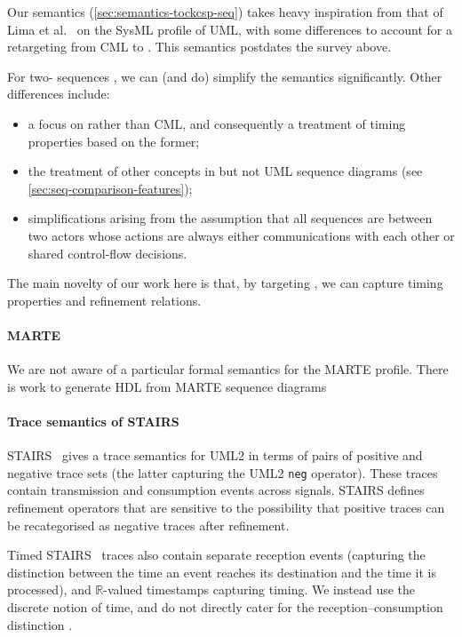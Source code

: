 Our semantics (\cref{sec:semantics-tockcsp-seq}) takes heavy inspiration from
that of Lima et al.~\cite{lima-semantics} on the SysML profile of UML, with
some differences to account for a retargeting from CML to \tockcsp.  This
semantics postdates the survey above.

For two-\mactor{} sequences , we can (and do)
simplify the semantics significantly.  Other differences include:

\begin{itemize}
\item a focus on \tockcsp{} rather than CML, and consequently a
  treatment of timing properties based on the former;
\item
  the treatment of other concepts in \langname{} but not UML sequence
  diagrams (see \cref{sec:seq-comparison-features});
\item simplifications arising from the assumption that all sequences
  are between two actors whose actions are always either communications with
  each other or shared control-flow decisions.
\end{itemize}

The main novelty of our work here is that, by targeting \tockcsp, we can capture
timing properties and refinement relations.

\paragraph{MARTE}

We are not aware of a particular formal semantics for the MARTE profile.
There is work to generate HDL from MARTE sequence diagrams~

\paragraph{Trace semantics of STAIRS}

STAIRS~\cite{Haugen03-STAIRS} gives a trace semantics for UML2 in terms
of pairs of positive and negative trace sets (the latter capturing the UML2
\texttt{neg} operator).  These traces contain
transmission and consumption events across signals.  STAIRS defines
refinement operators that are sensitive to the possibility that positive
traces can be recategorised as negative traces after refinement.

Timed
STAIRS~\cite{Haugen05-TimedSTAIRS} traces also contain separate reception
events (capturing the distinction between the time an event reaches
its destination and the time it is processed), and \(\mathbb R\)-valued
timestamps capturing timing.  We instead use the discrete \tockcsp{} notion
of time, and do not directly cater for the reception--consumption distinction
.

